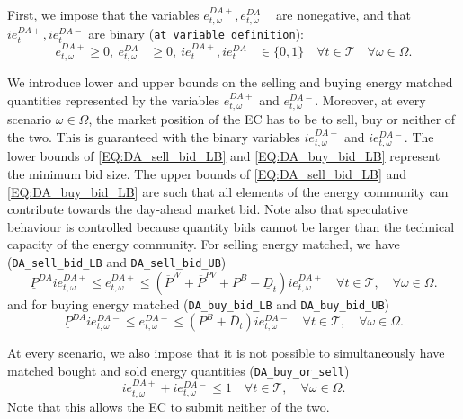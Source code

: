 \documentclass{article}
\begin{document}
First, we impose that the variables $e^{DA+}_{t, \omega}, e^{DA-}_{t, \omega}$ are nonegative, and that $ie^{DA+}_t, ie^{DA-}_t$ are binary (\verb|at variable definition|):
\begin{equation} \label{EQ:DAVarDef}
	e^{DA+}_{t, \omega} \geq 0, \ e^{DA-}_{t, \omega} \geq 0, \ ie^{DA+}_t, ie^{DA-}_t \in \{0, 1 \} \quad \forall t \in \mathcal{T} \quad \forall \omega \in \Omega.
\end{equation}

We introduce lower and upper bounds on the selling and buying energy matched quantities represented by the variables $e^{DA+}_{t, \omega}$ and $e^{DA-}_{t, \omega}$. Moreover, at every scenario $\omega \in \Omega$, the market position of the EC has to be to sell, buy or neither of the two. This is guaranteed with the binary variables $ie^{DA+}_{t, \omega}$ and $ie^{DA-}_{t, \omega}$. The lower bounds of \eqref{EQ:DA_sell_bid_LB} and \eqref{EQ:DA_buy_bid_LB} represent the minimum bid size. The upper bounds of \eqref{EQ:DA_sell_bid_LB} and \eqref{EQ:DA_buy_bid_LB} are such that all elements of the energy community can contribute towards the day-ahead market bid. Note also that speculative behaviour is controlled because quantity bids cannot be larger than the technical capacity of the energy community. For selling energy matched, we have (\verb|DA_sell_bid_LB| and \verb|DA_sell_bid_UB|)
\begin{equation} \label{EQ:DA_sell_bid_LB}
    \underline{P}^{DA} ie^{DA+}_{t, \omega} \leq e^{DA+}_{t, \omega} \leq (\overline{P}^W + \overline{P}^{PV} + P^B - \underline{D}_t) ie^{DA+}_{t, \omega}  \quad \forall t \in \mathcal{T}, \quad \forall \omega \in \Omega.
\end{equation}
and for buying energy matched (\verb|DA_buy_bid_LB| and \verb|DA_buy_bid_UB|)
\begin{equation} \label{EQ:DA_buy_bid_LB}
	\underline{P}^{DA} ie^{DA-}_{t, \omega} \leq e^{DA-}_{t, \omega} \leq (P^B + \overline{D}_t) ie^{DA-}_{t, \omega} \quad \forall t \in \mathcal{T}, \quad \forall \omega \in \Omega.
\end{equation}

At every scenario, we also impose that it is not possible to simultaneously have matched bought and sold energy quantities (\verb|DA_buy_or_sell|)
\begin{equation} \label{EQ:DA_buy_or_sell}
	ie^{DA+}_{t, \omega} + ie^{DA-}_{t, \omega} \leq 1 \quad \forall t \in \mathcal{T}, \quad \forall \omega \in \Omega.
\end{equation}
Note that this allows the EC to submit neither of the two.
\end{document}
